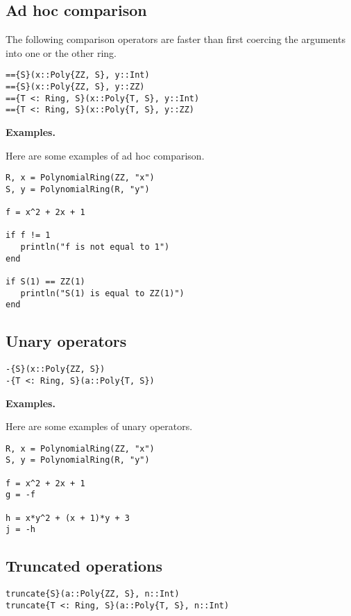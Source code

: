 \documentclass[a4paper,10pt]{article}
\begin{document}
{{{\subsection{Ad hoc comparison}

The following comparison operators are faster than first coercing the arguments
into one or the other ring.

\begin{lstlisting}
=={S}(x::Poly{ZZ, S}, y::Int)
=={S}(x::Poly{ZZ, S}, y::ZZ)
=={T <: Ring, S}(x::Poly{T, S}, y::Int)
=={T <: Ring, S}(x::Poly{T, S}, y::ZZ)
\end{lstlisting}

\textbf{Examples.}

Here are some examples of ad hoc comparison.

\begin{lstlisting}
R, x = PolynomialRing(ZZ, "x")
S, y = PolynomialRing(R, "y")

f = x^2 + 2x + 1

if f != 1
   println("f is not equal to 1")
end

if S(1) == ZZ(1)
   println("S(1) is equal to ZZ(1)")
end
\end{lstlisting}

\subsection{Unary operators}

\begin{lstlisting}
-{S}(x::Poly{ZZ, S})
-{T <: Ring, S}(a::Poly{T, S})
\end{lstlisting}

\textbf{Examples.}

Here are some examples of unary operators.

\begin{lstlisting}
R, x = PolynomialRing(ZZ, "x")
S, y = PolynomialRing(R, "y")

f = x^2 + 2x + 1
g = -f

h = x*y^2 + (x + 1)*y + 3
j = -h
\end{lstlisting}

\subsection{Truncated operations}

\begin{lstlisting}
truncate{S}(a::Poly{ZZ, S}, n::Int)
truncate{T <: Ring, S}(a::Poly{T, S}, n::Int)
\end{lstlisting}

}}}
\end{document}
